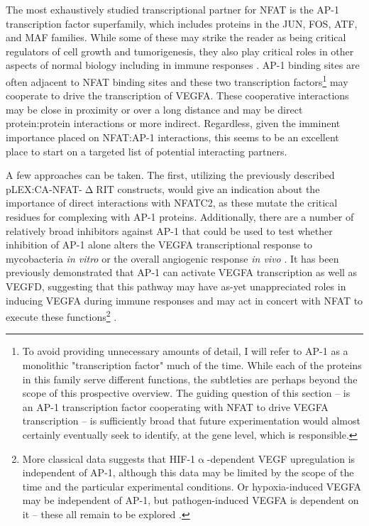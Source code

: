 The most exhaustively studied transcriptional partner for NFAT is the AP-1 transcription factor superfamily, which includes proteins in the JUN, FOS, ATF, and MAF families. While some of these may strike the reader as being critical regulators of cell growth and tumorigenesis, they also play critical roles in other aspects of normal biology including in immune responses \citep{Macian2001}. AP-1 binding sites are often adjacent to NFAT binding sites and these two transcription factors\footnote{To avoid providing unnecessary amounts of detail, I will refer to AP-1 as a monolithic "transcription factor" much of the time. While each of the proteins in this family serve different functions, the subtleties are perhaps beyond the scope of this prospective overview. The guiding question of this section -- is an AP-1 transcription factor cooperating with NFAT to drive VEGFA transcription -- is sufficiently broad that future experimentation would almost certainly eventually seek to identify, at the gene level, which is responsible.} may cooperate to drive the transcription of VEGFA. These cooperative interactions may be close in proximity or over a long distance and may be direct protein:protein interactions or more indirect. Regardless, given the imminent importance placed on NFAT:AP-1 interactions, this seems to be an excellent place to start on a targeted list of potential interacting partners.

A few approaches can be taken. The first, utilizing the previously described pLEX:CA-NFAT-$\upDelta$RIT constructs, would give an indication about the importance of direct interactions with NFATC2, as these mutate the critical residues for complexing with AP-1 proteins. Additionally, there are a number of relatively broad inhibitors against AP-1 that could be used to test whether inhibition of AP-1 alone alters the VEGFA transcriptional response to mycobacteria \textit{in vitro} or the overall angiogenic response \textit{in vivo} \citep{Makino2017, Huang1997}. It has been previously demonstrated that AP-1 can activate VEGFA transcription as well as VEGFD, suggesting that this pathway may have as-yet unappreciated roles in inducing VEGFA during immune responses and may act in concert with NFAT to execute these functions\footnote{More classical data suggests that HIF-1$\upalpha$-dependent VEGF upregulation is independent of AP-1, although this data may be limited by the scope of the time and the particular experimental conditions. Or hypoxia-induced VEGFA may be independent of AP-1, but pathogen-induced VEGFA is dependent on it -- these all remain to be explored \citep{Finkenzeller1995}.} \citep{Shih2001, Debinski2001, Wang2016, Josko2004, Guo2022}.

